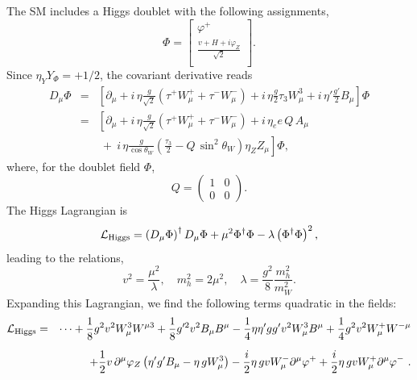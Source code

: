\documentclass{ws-ijmpa}
\begin{document}
The SM includes a Higgs doublet with the following assignments,
%
\begin{equation}
  \label{eq:50}
  \Phi = \left[
    \begin{matrix}
      \varphi^+ \\[+2mm]
      \displaystyle
       \frac{v + H + i \varphi_Z}{\sqrt{2}} \\
    \end{matrix}
\right].
\end{equation}
%
Since $\eta_Y Y_\Phi = + 1/2$,
the covariant derivative reads
%
\begin{eqnarray}
  D_\mu \Phi
&=& \left[ \partial_\mu + i\, \eta \frac{ g}{\sqrt{2}} \left(
 \tau^+ W_\mu^+ +  \tau^- W_\mu^- \right) +i\, \eta \frac{g}{2} \tau_3 W_\mu^3
+ i\, \eta' \frac{g'}{2} B_\mu \right] \Phi
\nonumber\\[+2mm]
&=&
\left[ \partial_\mu + i\,\eta \frac{g}{\sqrt{2}} \left(
\tau^+ W_\mu^+ +  \tau^- W_\mu^- \right) +i\, \eta_e e\, Q\,   A_\mu
\right.
\nonumber\\[+2mm]
& &
\left.
\ +\  i\,\eta \frac{g}{\cos\theta_W} \left(\frac{\tau_3}{2} - Q\, \sin^2\theta_W
\right)\eta_Z Z_\mu \right] \Phi,
\label{eq:90}
\end{eqnarray}
%
where, for the doublet field $\Phi$,
%
\begin{equation}
Q =
\left(
\begin{array}{cc}
1 & 0\\
0 & 0
\end{array}
\right).
\end{equation}
%
The Higgs Lagrangian is
%
\begin{equation}
  \label{eq:93}
\mathcal{L}_{\rm Higgs} =  \left(D_\mu \Phi\right)^\dagger D_\mu \Phi
+ \mu^2 \Phi^\dagger \Phi - \lambda \left(\Phi^\dagger \Phi\right)^2 ,
\end{equation}
%
leading to the relations,
%
\begin{equation}
  \label{eq:4}
  v^2 = \frac{\mu^2}{\lambda}, \quad m_h^2 = 2 \mu^2, \quad
 \lambda= \frac{g^2}{8} \frac{m_h^2}{m_W^2}.
\end{equation}
%
Expanding this Lagrangian,
we find the following terms quadratic in the fields:
%
\begin{eqnarray}
  \mathcal{L}_{\rm Higgs}
&=&
\cdots + 
\frac{1}{8} g^2 v^2 W_\mu^3 W^{\mu 3} + \frac{1}{8} g'^2 v^2 B_\mu B^{\mu}
- \frac{1}{4}\eta \eta' g g' v^2 W_\mu^3 B^{\mu} 
+ \frac{1}{4} g^2 v^2 W_\mu^+  W^{-\mu}
\nonumber\\[+2mm]
& &
+ \frac{1}{2} v\, \partial^\mu \varphi_Z \left(\eta' g' B_\mu -\eta\, g W_\mu^{3}
\right) - \frac{i}{2}\eta\, g v W_\mu^- \partial^\mu \varphi^+ 
+ \frac{i}{2}\eta\, g v W_\mu^+ \partial^\mu \varphi^- \ .
\label{eq:94}
\end{eqnarray}
\end{document}

